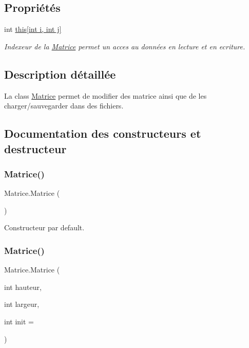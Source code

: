 \subsection*{Propriétés}
\begin{DoxyCompactItemize}
\item 
int \hyperlink{class_matrice_a264f2ef7eaf36019b8c84f5bca240efc}{this\mbox{[}int i, int j\mbox{]}}
\begin{DoxyCompactList}\small\item\em Indexeur de la \hyperlink{class_matrice}{Matrice} permet un acces au données en lecture et en ecriture. \end{DoxyCompactList}\end{DoxyCompactItemize}


\subsection{Description détaillée}
La class \hyperlink{class_matrice}{Matrice} permet de modifier des matrice ainsi que de les charger/sauvegarder dans des fichiers. 



\subsection{Documentation des constructeurs et destructeur}
\mbox{\label{class_matrice_a7281d022328e8f455eff2dc73a78593a}} 
\subsubsection{\texorpdfstring{Matrice()}{Matrice()}\hspace{0.1cm}{\footnotesize\ttfamily [1/3]}}
{\footnotesize\ttfamily Matrice.\+Matrice (\begin{DoxyParamCaption}{ }\end{DoxyParamCaption})}



Constructeur par default. 

\mbox{\label{class_matrice_af00cc9de4742a97a34d6dd3a4e5bca93}} 
\subsubsection{\texorpdfstring{Matrice()}{Matrice()}\hspace{0.1cm}{\footnotesize\ttfamily [2/3]}}
{\footnotesize\ttfamily Matrice.\+Matrice (\begin{DoxyParamCaption}\item[{int}]{hauteur,  }\item[{int}]{largeur,  }\item[{int}]{init = {} }\end{DoxyParamCaption})}



